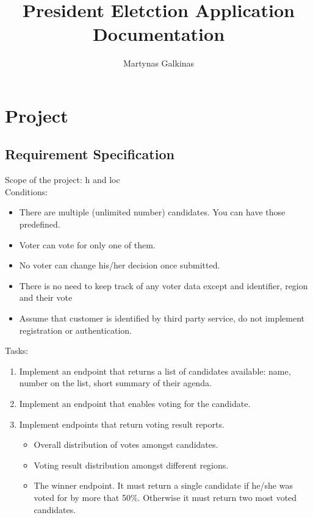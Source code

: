 \documentclass[12pt,a4paper]{article}
\title{President Eletction Application Documentation}
\author{Martynas Galkinas}
\begin{document}
\maketitle

\section{Project}
\subsection{Requirement Specification}
Scope of the project: h and loc \\
Conditions:
\begin{itemize}
    \item
        There are multiple (unlimited number) candidates. You can have those
        predefined.
    \item
        Voter can vote for only one of them.
    \item
        No voter can change his/her decision once submitted.
    \item
        There is no need to keep track of any voter data except and identifier,
        region and their vote
    \item
        Assume that customer is identified by third party service, do not
        implement registration or authentication.
\end{itemize}


Tasks:
\begin{enumerate}
    \item
        Implement an endpoint that returns a list of candidates available:
             name,
             number on the list,
             short summary of their agenda.
    \item
        Implement an endpoint that enables voting for the candidate.
    \item
        Implement endpoints that return voting result reports.
        \begin{itemize}
            \item Overall distribution of votes amongst candidates.
            \item Voting result distribution amongst different regions.
            \item The winner endpoint. It must return a single candidate
                if he/she was voted for by more that 50\%. Otherwise
                it must return two most voted candidates.
        \end{itemize}
\end{enumerate}
\end{document}

